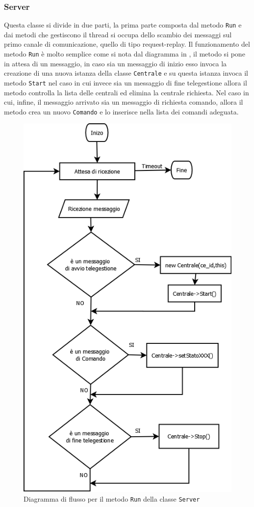 \subsubsection{Server}
Questa classe si divide in due parti, la prima parte composta dal metodo \texttt{Run} e dai metodi che gestiscono il thread si occupa dello scambio dei messaggi sul primo canale di comunicazione, quello di tipo request-replay. Il funzionamento del metodo \texttt{Run} è molto semplice come si nota dal diagramma in , il metodo si pone in attesa di un messaggio, in caso sia un messaggio di inizio esso invoca la creazione di una nuova istanza della classe \texttt{Centrale} e su questa istanza invoca il metodo \texttt{Start} nel caso in cui invece sia un messaggio di fine telegestione allora il metodo controlla la lista delle centrali ed elimina la centrale richiesta. Nel caso in cui, infine, il messaggio arrivato sia un messaggio di richiesta comando, allora il metodo crea un nuovo \texttt{Comando} e lo inserisce nella lista dei comandi adeguata.
\begin{figure}
\centering
\includegraphics[width=0.7\linewidth]{pictures/flussoserver.png}
\caption{Diagramma di flusso per il metodo \texttt{Run} della classe \texttt{Server}}\label{fig:flussoserver}
\end{figure}
